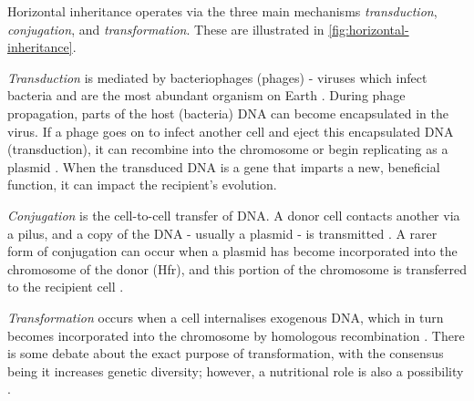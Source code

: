 Horizontal inheritance operates via the three main mechanisms \emph{transduction}, \emph{conjugation}, and \emph{transformation}. These are illustrated in \autoref{fig:horizontal-inheritance}.

\emph{Transduction} is mediated by bacteriophages (phages) - viruses which infect bacteria and are the most abundant organism on Earth \cite{mcgrath2007bacteriophage}. During phage propagation, parts of the host (bacteria) DNA can become encapsulated in the virus. If a phage goes on to infect another cell and eject this encapsulated DNA (transduction), it can recombine into the chromosome or begin replicating as a plasmid \cite{Chiang2019}. When the transduced DNA is a gene that imparts a new, beneficial function, it can impact the recipient's evolution.

\emph{Conjugation} is the cell-to-cell transfer of DNA. A donor cell contacts another via a pilus, and a copy of the DNA - usually a plasmid - is transmitted \cite{Soucy2015}. A rarer form of conjugation can occur when a plasmid has become incorporated into the chromosome of the donor (Hfr), and this portion of the chromosome is transferred to the recipient cell \cite{Redfield2001}.

\emph{Transformation} occurs when a cell internalises exogenous DNA, which in turn becomes incorporated into the chromosome by homologous recombination \cite{Johnston2014}. There is some debate about the exact purpose of transformation, with the consensus being it increases genetic diversity; however, a nutritional role is also a possibility \cite{Johnston2014}.

